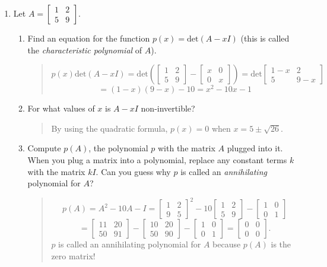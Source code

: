 \documentclass[letter]{article}
\newcommand{\Det}{\mathrm{det}}
\newcommand{\mat}[1]{\begin{bmatrix}#1\end{bmatrix}}
\begin{document}
\begin{enumerate}
		\item Let $A=\mat{1&2\\5&9}$.
		\begin{enumerate}
			\item Find an equation for the function $p(x)=\Det(A-xI)$ (this is called the
				\emph{characteristic polynomial} of $A$).
					\begin{quote}
						\[
							p(x)\Det(A-xI) = \Det\left(\mat{1&2\\5&9}-\mat{x&0\\0&x}\right)
							=\Det\mat{1-x&2\\5&9-x}
						\]\[
							=(1-x)(9-x)-10=x^2-10x-1
						\]
					\end{quote}
			\item For what values of $x$ is $A-xI$ non-invertible?
					\begin{quote}
						By using the quadratic formula, $p(x)=0$ when 
						$x=5\pm\sqrt{26}$.
					\end{quote}
			\item Compute $p(A)$, the polynomial $p$ with the matrix $A$ plugged into it.  When you plug a matrix
				into a polynomial, replace any constant terms $k$ with the matrix $kI$.
				Can you guess
				why $p$ is called an \emph{annihilating} polynomial for $A$?
					\begin{quote}
						\[
							p(A) = A^2-10A-I=
							\mat{1&2\\9&5}^2-10\mat{1&2\\5&9}-\mat{1&0\\0&1}
						\]\[
							=\mat{11&20\\50&91} - \mat{10&20\\50&90}-\mat{1&0\\0&1}
							=\mat{0&0\\0&0}.
						\]
						$p$ is called an annihilating polynomial for $A$ because $p(A)$ is the zero matrix!
					\end{quote}
		\end{enumerate}

	\end{enumerate}
\end{document}
